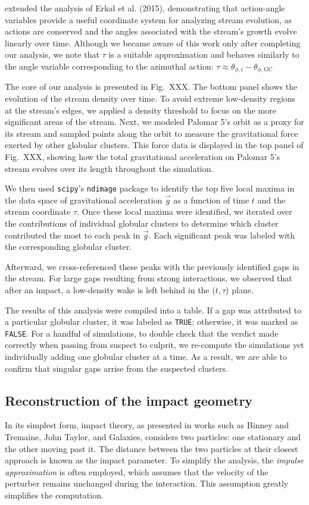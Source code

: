 \documentclass[draft]{aa}
\begin{document}
      \citet{sanders2016dynamics} extended the analysis of Erkal et al. (2015), demonstrating that action-angle variables provide a useful coordinate system for analyzing stream evolution, as actions are conserved and the angles associated with the stream's growth evolve linearly over time. Although we became aware of this work only after completing our analysis, we note that $\tau$ is a suitable approximation and behaves similarly to the angle variable corresponding to the azimuthal action: $\tau \approx \theta_{\phi,i} - \theta_{\phi,\text{GC}}$

      The core of our analysis is presented in Fig.~XXX. The bottom panel shows the evolution of the stream density over time. To avoid extreme low-density regions at the stream's edges, we applied a density threshold to focus on the more significant areas of the stream. Next, we modeled Palomar 5's orbit as a proxy for its stream and sampled points along the orbit to measure the gravitational force exerted by other globular clusters. This force data is displayed in the top panel of Fig.~XXX, showing how the total gravitational acceleration on Palomar 5's stream evolves over its length throughout the simulation.

      We then used \texttt{scipy}'s \texttt{ndimage} package to identify the top five local maxima in the data space of gravitational acceleration $\vec{g}$ as a function of time $t$ and the stream coordinate $\tau$. Once these local maxima were identified, we iterated over the contributions of individual globular clusters to determine which cluster contributed the most to each peak in $\vec{g}$. Each significant peak was labeled with the corresponding globular cluster.


      Afterward, we cross-referenced these peaks with the previously identified gaps in the stream. For large gaps resulting from strong interactions, we observed that after an impact, a low-density wake is left behind in the ($t,\tau$) plane.

      The results of this analysis were compiled into a table. If a gap was attributed to a particular globular cluster, it was labeled as \texttt{TRUE}; otherwise, it was marked as \texttt{FALSE}. For a handful of simulations, to double check that the verdict made correctly when passing from suspect to culprit, we re-compute the simulations yet individually adding one globular cluster at a time. As a result, we are able to confirm that singular gaps arrise from the suspected clusters.  


  \subsection{Reconstruction of the impact geometry}
    In its simplest form, impact theory, as presented in works such as Binney and Tremaine, John Taylor, and Galaxies, considers two particles: one stationary and the other moving past it. The distance between the two particles at their closest approach is known as the impact parameter. To simplify the analysis, the \textit{impulse approximation} is often employed, which assumes that the velocity of the perturber remains unchanged during the interaction. This assumption greatly simplifies the computation.
\end{document}
